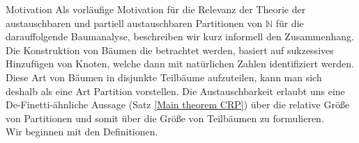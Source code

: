 \begin{section}{Motivation}
Als vorläufige Motivation für die Relevanz der Theorie der austauschbaren und partiell austauschbaren Partitionen von $\mathbb{N}$ für die darauffolgende Baumanalyse, beschreiben wir kurz informell den Zusammenhang. Die Konstruktion von Bäumen die betrachtet werden, basiert auf sukzessives Hinzufügen von Knoten, welche dann mit natürlichen Zahlen identifiziert werden. Diese Art von Bäumen in disjunkte Teilbäume aufzuteilen, kann man sich deshalb als eine Art Partition vorstellen. Die Austauschbarkeit erlaubt uns eine De-Finetti-ähnliche Aussage (Satz \ref{Main theorem CRP}) über die relative Größe von Partitionen und somit über die Größe von Teilbäumen zu formulieren. \\
Wir beginnen mit den Definitionen. 
\end{section}
